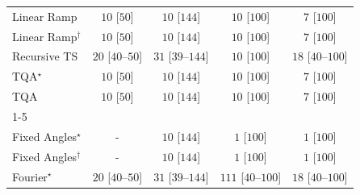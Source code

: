 \begin{tabular}{l|cccc|}
Linear Ramp & {\cellcolor[HTML]{F6FCF4}} \color[HTML]{000000} $10$ [$50$] & {\cellcolor[HTML]{F6FCF4}} \color[HTML]{000000} $10$ [$144$] & {\cellcolor[HTML]{F6FCF4}} \color[HTML]{000000} $10$ [$100$] & {\cellcolor[HTML]{F6FCF4}} \color[HTML]{000000} $7$ [$100$] \\
Linear Ramp$^\dagger$ & {\cellcolor[HTML]{F6FCF4}} \color[HTML]{000000} $10$ [$50$] & {\cellcolor[HTML]{F6FCF4}} \color[HTML]{000000} $10$ [$144$] & {\cellcolor[HTML]{F6FCF4}} \color[HTML]{000000} $10$ [$100$] & {\cellcolor[HTML]{F6FCF4}} \color[HTML]{000000} $7$ [$100$] \\
Recursive TS & {\cellcolor[HTML]{F4FBF1}} \color[HTML]{000000} $20$ [$40$--$50$] & {\cellcolor[HTML]{F2FAEF}} \color[HTML]{000000} $31$ [$39$--$144$] & {\cellcolor[HTML]{F6FCF4}} \color[HTML]{000000} $10$ [$100$] & {\cellcolor[HTML]{F4FBF2}} \color[HTML]{000000} $18$ [$40$--$100$] \\
TQA$^\star$ & {\cellcolor[HTML]{F6FCF4}} \color[HTML]{000000} $10$ [$50$] & {\cellcolor[HTML]{F6FCF4}} \color[HTML]{000000} $10$ [$144$] & {\cellcolor[HTML]{F6FCF4}} \color[HTML]{000000} $10$ [$100$] & {\cellcolor[HTML]{F6FCF4}} \color[HTML]{000000} $7$ [$100$] \\
TQA & {\cellcolor[HTML]{F6FCF4}} \color[HTML]{000000} $10$ [$50$] & {\cellcolor[HTML]{F6FCF4}} \color[HTML]{000000} $10$ [$144$] & {\cellcolor[HTML]{F6FCF4}} \color[HTML]{000000} $10$ [$100$] & {\cellcolor[HTML]{F6FCF4}} \color[HTML]{000000} $7$ [$100$] \\
\cline{1-5}
\multicolumn{5}{c}{\rule{0pt}{8pt}PP} \\
\midrule
Fixed Angles$^\star$ & {\cellcolor[HTML]{000000}} \color[HTML]{F1F1F1} {\cellcolor{white}} \color{black} - & {\cellcolor[HTML]{F6FCF4}} \color[HTML]{000000} $10$ [$144$] & {\cellcolor[HTML]{F7FCF5}} \color[HTML]{000000} $1$ [$100$] & {\cellcolor[HTML]{F7FCF5}} \color[HTML]{000000} $1$ [$100$] \\
Fixed Angles$^\dagger$ & {\cellcolor[HTML]{000000}} \color[HTML]{F1F1F1} {\cellcolor{white}} \color{black} - & {\cellcolor[HTML]{F6FCF4}} \color[HTML]{000000} $10$ [$144$] & {\cellcolor[HTML]{F7FCF5}} \color[HTML]{000000} $1$ [$100$] & {\cellcolor[HTML]{F7FCF5}} \color[HTML]{000000} $1$ [$100$] \\
Fourier$^\star$ & {\cellcolor[HTML]{F4FBF1}} \color[HTML]{000000} $20$ [$40$--$50$] & {\cellcolor[HTML]{F2FAEF}} \color[HTML]{000000} $31$ [$39$--$144$] & {\cellcolor[HTML]{E1F3DC}} \color[HTML]{000000} $111$ [$40$--$100$] & {\cellcolor[HTML]{F4FBF2}} \color[HTML]{000000} $18$ [$40$--$100$] \\

\end{tabular}
